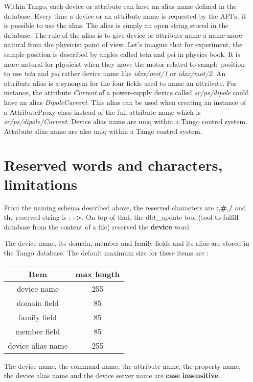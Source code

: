 Within Tango, each device or attribute can have an alias name defined
in the database. Every time a device or an attribute name is requested
by the API's, it is possible to use the alias. The alias is simply
an open string stored in the database. The rule of the alias is to
give device or attribute name a name more natural from the physicist
point of view. Let's imagine that for experiment, the sample position
is described by angles called teta and psi in physics book. It is
more natural for physicist when they move the motor related to sample
position to use \emph{teta} and \emph{psi} rather device name like
\emph{idxx/mot/1} or \emph{idxx/mot/2}. An attribute alias is a synonym
for the four fields used to name an attribute. For instance, the attribute
\emph{Current} of a power-supply device called \emph{sr/ps/dipole}
could have an alias \emph{DipoleCurrent}. This alias can be used when
creating an instance of a AttributeProxy class instead of the full
attribute name which is \emph{sr/ps/dipole/Current}. Device alias
name are uniq within a Tango control system. Attribute alias name
are also uniq within a Tango control system.

\section{Reserved words and characters, limitations}

From the naming schema described above, the reserved characters are
\textbf{:},\textbf{\#},\textbf{/} and the reserved string is : \textbf{->}.
On top of that, the dbt\_update tool (tool to fulfill database from
the content of a file) reserved the \textbf{device} word

The device name, its domain, member and family fields and its alias
are stored in the Tango database. The default maximum size for these
items are :

\vspace{0.3cm}

\begin{center}
\begin{longtable}{|c|c|}
\hline 
Item & max length\tabularnewline
\hline 
\hline 
device name & 255\tabularnewline
\hline 
domain field & 85\tabularnewline
\hline 
family field & 85\tabularnewline
\hline 
member field & 85\tabularnewline
\hline 
device alias name & 255\tabularnewline
\hline 
\end{longtable}
\par\end{center}

\vspace{0.3cm}

The device name, the command name, the attribute name, the property
name, the device alias name and the device server name are \textbf{case
insensitive}.
